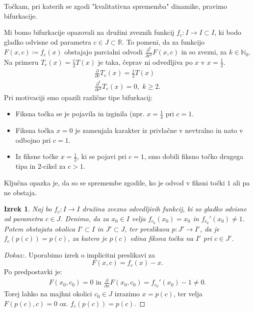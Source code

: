 \documentclass{article}
\newtheorem{izrek}{Izrek}
\newcommand{\N}{\mathbb{N}}
\newcommand{\R}{\mathbb{R}}
\begin{document}
Točkam, pri katerih se zgodi "kvalitativna sprememba" dinamike, pravimo bifurkacije.

Mi bomo bifurkacije opazovali na družini zveznih funkcij $f_c: I \rightarrow I \subset I$, ki bodo gladko odvisne od parametra $c\in J \subset \R$. To pomeni, da za funkcijo $F(x, c) \coloneqq f_c(x)$ obstajajo parcialni odvodi $\frac{\partial^k}{\partial c^k} F(x, c)$ in so zvezni, za $k\in \N_0$. Na primeru $T_c(x) = \frac{c}{2} T(x)$ je taka, čeprav ni odvedljiva po $x$ v $x = \frac{1}{2}$.
\begin{align*}
\frac{\partial}{\partial c} T_c(x) = \frac{1}{2} T(x) \\ 
\frac{\partial^k}{\partial c^k} T_c(x) = 0, \,\, k \geq 2.
\end{align*}
Pri motivaciji smo opazili različne tipe bifurkacij:
\begin{itemize}
\item Fiksna točka se je pojavila in izginila (npr. $x = \frac{1}{4}$ pri $c=1$.
\item Fiksna točka $x=0$ je zamenjala karakter iz privlačne v nevtralno in nato v odbojno pri $c = 1$.
\item Iz fiksne točke $x = \frac{1}{2}$, ki se pojavi pri $c = 1$, smo dobili fiksno točko drugega tipa in $2$-cikel za $c>1$.
\end{itemize}
Ključna opazka je, da so se spremembe zgodile, ko je odvod v fiksni točki $1$ ali pa ne obstaja.

\begin{izrek}
Naj bo $f_c: I \rightarrow I$ družina zvezno odvedljivih funkcij, ki so gladko odvisne od parametra $c\in J$. Denimo, da za $x_0 \in I$ velja $f_{c_0}(x_0) = x_0$ in $f_{c_0}'(x_0) \neq 1$. Potem obstajata okolica $I' \subset I$ in $J' \subset J$, ter preslikava $p: J' \rightarrow I'$, da je $f_c(p(c)) = p(c)$, za katero je $p(c)$ edina fiksna točka na $I'$ pri $c\in J'$. 
\end{izrek}

\begin{proof}[Dokaz:]
Uporabimo izrek o implicitni preslikavi za 
$$
F(x, c) = f_c(x) - x.
$$
Po predpostavki je:
\begin{align*}
F(x_0, c_0) = 0 \text{ in } \frac{\partial}{\partial x} F(x_0, c_0) = f_{c_0}'(x_0) - 1 \neq 0. 
\end{align*}
Torej lahko na majhni okolici $c_0 \in J$ izrazimo $x = p(c)$, ter velja $F(p(c), c) = 0$ oz. $f_c(p(c)) = p(c)$.
\end{proof}
\end{document}
